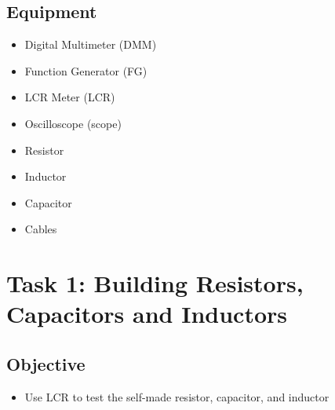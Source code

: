 \documentclass[journal, letterpaper]{IEEEtran}
\begin{document}
    \subsection{Equipment}
    	\begin{multicols}{2}
          \begin{flushleft}
    		\begin{itemize}
            \item Digital Multimeter (DMM)
            \item Function Generator (FG)
            \item LCR Meter (LCR)
            \item Oscilloscope (scope)
            \item Resistor
            \item Inductor
            \item Capacitor
            \item Cables
            \end{itemize}
          \end{flushleft}
    	\end{multicols}
    	
\section{\textbf{Task 1: Building Resistors, Capacitors and Inductors}}
	\subsection{Objective}
    	\begin{itemize}
    		\item Use LCR to test the self-made resistor, capacitor, and inductor
    		\end{itemize}
\end{document}
